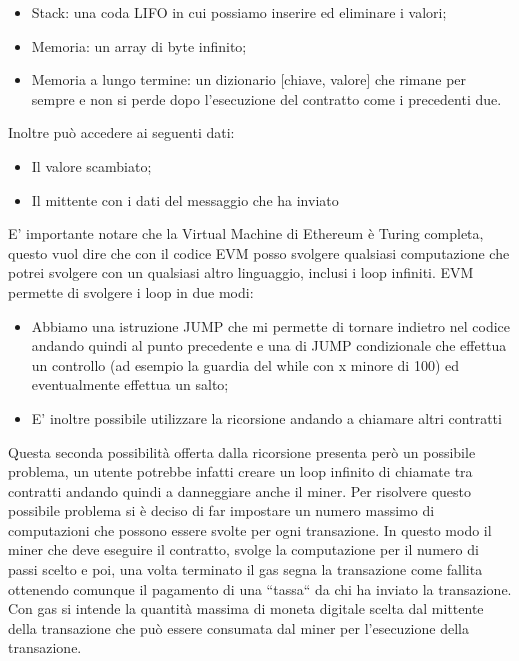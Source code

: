 \documentclass[12pt]{report}
\begin{document}
\begin{itemize}
\item Stack: una coda LIFO in cui possiamo inserire ed eliminare i valori;
\item Memoria: un array di byte infinito;
\item Memoria a lungo termine: un dizionario [chiave, valore] che rimane per sempre e non si perde dopo l'esecuzione del contratto come i precedenti due.
\end{itemize}

Inoltre può accedere ai seguenti dati:

\begin{itemize}
\item Il valore scambiato;
\item Il mittente con i dati del messaggio che ha inviato
\end{itemize}

E' importante notare che la Virtual Machine di Ethereum è Turing completa, questo vuol dire che con il codice EVM posso svolgere qualsiasi computazione che potrei svolgere con un qualsiasi altro linguaggio, inclusi i loop infiniti.
EVM permette di svolgere i loop in due modi:
\begin{itemize}
\item Abbiamo una istruzione JUMP che mi permette di tornare indietro nel codice andando quindi al punto precedente e una di JUMP condizionale che effettua un controllo (ad esempio la guardia del while con x minore di 100) ed eventualmente effettua un salto;
\item E' inoltre possibile utilizzare la ricorsione andando a chiamare altri contratti
\end{itemize}

Questa seconda possibilità offerta dalla ricorsione presenta però un possibile problema, un utente potrebbe infatti creare un loop infinito di chiamate tra contratti andando quindi a danneggiare anche il miner.
Per risolvere questo possibile problema si è deciso di far impostare un numero massimo di computazioni che possono essere svolte per ogni transazione.
In questo modo il miner che deve eseguire il contratto, svolge la computazione per il numero di passi scelto e poi, una volta terminato il gas segna la transazione come fallita ottenendo comunque il pagamento di una ``tassa`` da chi ha inviato la transazione.
Con gas si intende la quantità massima di moneta digitale scelta dal mittente della transazione che può essere consumata dal miner per l'esecuzione della transazione.
\end{document}
